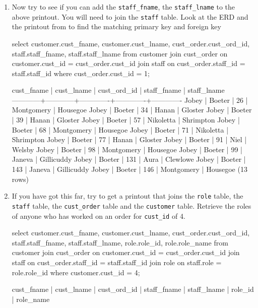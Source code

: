 \begin{enumerate}
\begin{pseudo*}
(13 rows)
\end{pseudo*}
\item Now try to see if you can add the \verb|staff_fname|, the \verb|staff_lname| to the above printout. You will need to join the \verb|staff| table. Look at the ERD and the printout from  to find the matching primary key and foreign key
\begin{sql}
select customer.cust_fname, customer.cust_lname, cust_order.cust_ord_id, staff.staff_fname, staff.staff_lname from customer
join cust_order on customer.cust_id = cust_order.cust_id
join staff on cust_order.staff_id = staff.staff_id
where cust_order.cust_id = 1;
\end{sql}
\begin{pseudo*}
 cust_fname | cust_lname | cust_ord_id | staff_fname | staff_lname
------------+------------+-------------+-------------+-------------
 Jobey      | Boeter     |          26 | Montgomery  | Housegoe
 Jobey      | Boeter     |          34 | Hanan       | Gloster
 Jobey      | Boeter     |          39 | Hanan       | Gloster
 Jobey      | Boeter     |          57 | Nikoletta   | Shrimpton
 Jobey      | Boeter     |          68 | Montgomery  | Housegoe
 Jobey      | Boeter     |          71 | Nikoletta   | Shrimpton
 Jobey      | Boeter     |          77 | Hanan       | Gloster
 Jobey      | Boeter     |          91 | Niel        | Welsby
 Jobey      | Boeter     |          98 | Montgomery  | Housegoe
 Jobey      | Boeter     |          99 | Janeva      | Gillicuddy
 Jobey      | Boeter     |         131 | Aura        | Clewlowe
 Jobey      | Boeter     |         143 | Janeva      | Gillicuddy
 Jobey      | Boeter     |         146 | Montgomery  | Housegoe
(13 rows)
\end{pseudo*}
\item If you have got this far, try to get a printout that joins the \verb|role| table, the \verb|staff| table, the \verb|cust_order| table and the \verb|customer| table. Retrieve the roles of anyone who has worked on an order for \verb|cust_id| of 4.
\begin{sql}
select customer.cust_fname, customer.cust_lname, cust_order.cust_ord_id, staff.staff_fname, staff.staff_lname, role.role_id, role.role_name from customer
join cust_order on customer.cust_id = cust_order.cust_id
join staff on cust_order.staff_id = staff.staff_id
join role on staff.role = role.role_id
where customer.cust_id = 4;
\end{sql}
\begin{pseudo*}
 cust_fname |    cust_lname    | cust_ord_id | staff_fname | staff_lname | role_id |    role_name

\end{pseudo*}
\end{enumerate}
